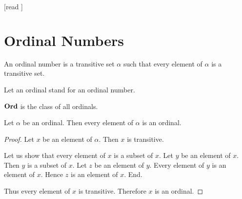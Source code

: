 \documentclass[10pt]{article}
\begin{document}
  \begin{imports}
    \begin{forthel}
      [read ]
    \end{forthel}
  \end{imports}


  \section*{Ordinal Numbers}

  \begin{forthel}
    \begin{definition}[id=SET_THEORY_02_229593678086144,printid]
      An ordinal number is a transitive set $\alpha$ such that every element of $\alpha$ is a transitive set.
    \end{definition}

    Let an ordinal stand for an ordinal number.
  \end{forthel}

  \begin{forthel}
    \begin{definition}[id=SET_THEORY_02_5852994258075648,printid]
      $\textbf{Ord}$ is the class of all ordinals.
    \end{definition}
  \end{forthel}

  \begin{forthel}
    \begin{proposition}[id=SET_THEORY_02_2358097091756032,printid]
      Let $\alpha$ be an ordinal.
      Then every element of $\alpha$ is an ordinal.
    \end{proposition}
    \begin{proof}
      Let $x$ be an element of $\alpha$.
      Then $x$ is transitive.

      Let us show that every element of $x$ is a subset of $x$.
        Let $y$ be an element of $x$.
        Then $y$ is a subset of $x$.
        Let $z$ be an element of $y$.
        Every element of $y$ is an element of $x$.
        Hence $z$ is an element of $x$.
      End.

      Thus every element of $x$ is transitive.
      Therefore $x$ is an ordinal.
    \end{proof}
  \end{forthel}
\end{document}
